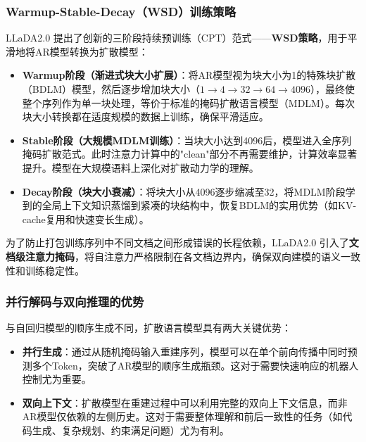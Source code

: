 \subsubsection{Warmup-Stable-Decay（WSD）训练策略}
LLaDA2.0 提出了创新的三阶段持续预训练（CPT）范式——\textbf{WSD策略}，用于平滑地将AR模型转换为扩散模型：
\begin{itemize}
    \item \textbf{Warmup阶段（渐进式块大小扩展）}：将AR模型视为块大小为1的特殊块扩散（BDLM）模型，然后逐步增加块大小（$1 \to 4 \to 32 \to 64 \to 4096$），最终使整个序列作为单一块处理，等价于标准的掩码扩散语言模型（MDLM）。每次块大小转换都在适度规模的数据上训练，确保平滑适应。
    \item \textbf{Stable阶段（大规模MDLM训练）}：当块大小达到4096后，模型进入全序列掩码扩散范式。此时注意力计算中的"clean"部分不再需要维护，计算效率显著提升。模型在大规模语料上深化对扩散动力学的理解。
    \item \textbf{Decay阶段（块大小衰减）}：将块大小从4096逐步缩减至32，将MDLM阶段学到的全局上下文知识蒸馏到紧凑的块结构中，恢复BDLM的实用优势（如KV-cache复用和快速变长生成）。
\end{itemize}

为了防止打包训练序列中不同文档之间形成错误的长程依赖，LLaDA2.0 引入了\textbf{文档级注意力掩码}，将自注意力严格限制在各文档边界内，确保双向建模的语义一致性和训练稳定性。

\subsubsection{并行解码与双向推理的优势}
与自回归模型的顺序生成不同，扩散语言模型具有两大关键优势：
\begin{itemize}
    \item \textbf{并行生成}：通过从随机掩码输入重建序列，模型可以在单个前向传播中同时预测多个Token，突破了AR模型的顺序生成瓶颈。这对于需要快速响应的机器人控制尤为重要。
    \item \textbf{双向上下文}：扩散模型在重建过程中可以利用完整的双向上下文信息，而非AR模型仅依赖的左侧历史。这对于需要整体理解和前后一致性的任务（如代码生成、复杂规划、约束满足问题）尤为有利。
\end{itemize}

